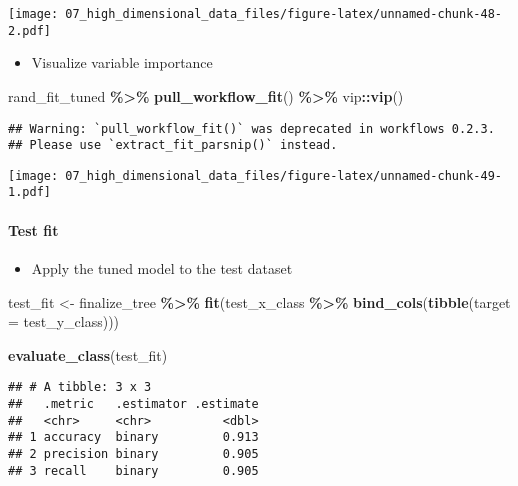 \documentclass[
]{book}
\newenvironment{Shaded}{\begin{snugshade}}{\end{snugshade}}
\newcommand{\DataTypeTok}[1]{\textcolor[rgb]{0.13,0.29,0.53}{#1}}
\newcommand{\KeywordTok}[1]{\textcolor[rgb]{0.13,0.29,0.53}{\textbf{#1}}}
\newcommand{\NormalTok}[1]{#1}
\newcommand{\OperatorTok}[1]{\textcolor[rgb]{0.81,0.36,0.00}{\textbf{#1}}}
\newcommand{\StringTok}[1]{\textcolor[rgb]{0.31,0.60,0.02}{#1}}
\providecommand{\tightlist}{%
  \setlength{\itemsep}{0pt}\setlength{\parskip}{0pt}}
\begin{document}
\texttt{[image: 07\_high\_dimensional\_data\_files/figure-latex/unnamed-chunk-48-2.pdf]}

\begin{itemize}
\tightlist
\item
  Visualize variable importance
\end{itemize}

\begin{Shaded}
\begin{Highlighting}[]
\NormalTok{rand\_fit\_tuned }\OperatorTok{\%\textgreater{}\%}
\StringTok{  }\KeywordTok{pull\_workflow\_fit}\NormalTok{() }\OperatorTok{\%\textgreater{}\%}
\StringTok{  }\NormalTok{vip}\OperatorTok{::}\KeywordTok{vip}\NormalTok{()}
\end{Highlighting}
\end{Shaded}

\begin{verbatim}
## Warning: `pull_workflow_fit()` was deprecated in workflows 0.2.3.
## Please use `extract_fit_parsnip()` instead.
\end{verbatim}

\texttt{[image: 07\_high\_dimensional\_data\_files/figure-latex/unnamed-chunk-49-1.pdf]}

\hypertarget{test-fit-2}{%
\paragraph{Test fit}\label{test-fit-2}}

\begin{itemize}
\tightlist
\item
  Apply the tuned model to the test dataset
\end{itemize}

\begin{Shaded}
\begin{Highlighting}[]
\NormalTok{test\_fit \textless{}{-}}\StringTok{ }\NormalTok{finalize\_tree }\OperatorTok{\%\textgreater{}\%}
\StringTok{  }\KeywordTok{fit}\NormalTok{(test\_x\_class }\OperatorTok{\%\textgreater{}\%}
\StringTok{    }\KeywordTok{bind\_cols}\NormalTok{(}\KeywordTok{tibble}\NormalTok{(}\DataTypeTok{target =}\NormalTok{ test\_y\_class)))}

\KeywordTok{evaluate\_class}\NormalTok{(test\_fit)}
\end{Highlighting}
\end{Shaded}

\begin{verbatim}
## # A tibble: 3 x 3
##   .metric   .estimator .estimate
##   <chr>     <chr>          <dbl>
## 1 accuracy  binary         0.913
## 2 precision binary         0.905
## 3 recall    binary         0.905
\end{verbatim}
\end{document}
